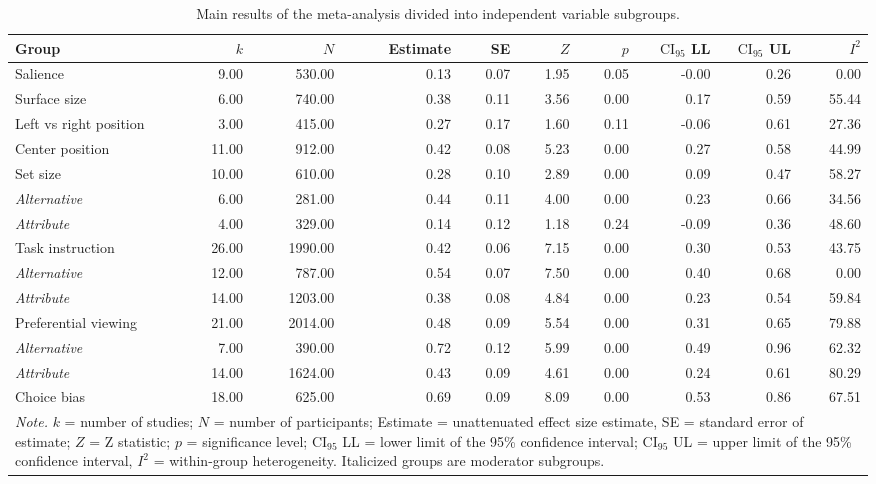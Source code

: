 \begin{table}[ht]
\centering
\caption{Main results of the meta-analysis divided into independent variable subgroups.} 
\label{tab:main_results}
\begin{tabular}{lrrrrrrrrr}
  \hline
Group & $k$ & $N$ & Estimate & SE & $Z$ & $p$ & $\textrm{CI}_{95}$ LL & $\textrm{CI}_{95}$ UL & $I^2$ \\ 
  \hline
Salience & 9.00 & 530.00 & 0.13 & 0.07 & 1.95 & 0.05 & -0.00 & 0.26 & 0.00 \\ 
  Surface size & 6.00 & 740.00 & 0.38 & 0.11 & 3.56 & 0.00 & 0.17 & 0.59 & 55.44 \\ 
  Left vs right position & 3.00 & 415.00 & 0.27 & 0.17 & 1.60 & 0.11 & -0.06 & 0.61 & 27.36 \\ 
  Center position & 11.00 & 912.00 & 0.42 & 0.08 & 5.23 & 0.00 & 0.27 & 0.58 & 44.99 \\ 
  Set size & 10.00 & 610.00 & 0.28 & 0.10 & 2.89 & 0.00 & 0.09 & 0.47 & 58.27 \\ 
  \textit{Alternative} & 6.00 & 281.00 & 0.44 & 0.11 & 4.00 & 0.00 & 0.23 & 0.66 & 34.56 \\ 
  \textit{Attribute} & 4.00 & 329.00 & 0.14 & 0.12 & 1.18 & 0.24 & -0.09 & 0.36 & 48.60 \\ 
  Task instruction & 26.00 & 1990.00 & 0.42 & 0.06 & 7.15 & 0.00 & 0.30 & 0.53 & 43.75 \\ 
  \textit{Alternative} & 12.00 & 787.00 & 0.54 & 0.07 & 7.50 & 0.00 & 0.40 & 0.68 & 0.00 \\ 
  \textit{Attribute} & 14.00 & 1203.00 & 0.38 & 0.08 & 4.84 & 0.00 & 0.23 & 0.54 & 59.84 \\ 
  Preferential viewing & 21.00 & 2014.00 & 0.48 & 0.09 & 5.54 & 0.00 & 0.31 & 0.65 & 79.88 \\ 
  \textit{Alternative} & 7.00 & 390.00 & 0.72 & 0.12 & 5.99 & 0.00 & 0.49 & 0.96 & 62.32 \\ 
  \textit{Attribute} & 14.00 & 1624.00 & 0.43 & 0.09 & 4.61 & 0.00 & 0.24 & 0.61 & 80.29 \\ 
  Choice bias & 18.00 & 625.00 & 0.69 & 0.09 & 8.09 & 0.00 & 0.53 & 0.86 & 67.51 \\ 
   \hline 
 \multicolumn{10}{p{0.9\textwidth}}{\scriptsize{\textit{Note.} $k$ = number of studies; $N$ = number of participants; Estimate = unattenuated effect size estimate, SE = standard error of estimate; $Z$ = Z statistic; $p$ = significance level; $\textrm{CI}_{95}$ LL = lower limit of the 95\% confidence interval; $\textrm{CI}_{95}$ UL = upper limit of the 95\% confidence interval, $I^2$ = within-group heterogeneity. Italicized groups are moderator subgroups.}} 
\end{tabular}
\end{table}
